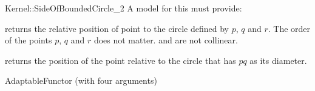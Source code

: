 \begin{ccRefFunctionObjectConcept}{Kernel::SideOfBoundedCircle_2}
A model for this must provide:


         {returns the relative position of point 
          to the circle defined by $p$, $q$ and $r$. The order
          of the points $p$, $q$ and $r$ does not matter.
          \ccPrecond {} and  are not collinear.}

         {returns the position of the point  relative to the circle
          that has $pq$ as its diameter.}

\ccRefines
AdaptableFunctor (with four arguments)

\ccSeeAlso
{} \\

\end{ccRefFunctionObjectConcept}
